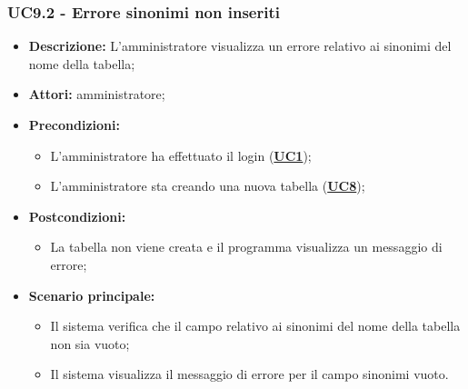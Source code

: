 \documentclass[5pt]{article}
\begin{document}
\subsubsection{UC9.2 - Errore sinonimi non inseriti}
\label{sec:UC9.2}
\begin{itemize}
	\item \textbf{Descrizione:} L’amministratore visualizza un errore relativo ai sinonimi del nome della tabella;
	\item \textbf{Attori:} amministratore;
	\item \textbf{Precondizioni:} 
	\begin{itemize}
		\item L’amministratore ha effettuato il login (\hyperref[sec:UC1]{\textbf{UC1}});
		\item L’amministratore sta creando una nuova tabella (\hyperref[sec:UC1]{\textbf{UC8}});
	\end{itemize}
	\item \textbf{Postcondizioni:} 
	\begin{itemize}
		\item La tabella non viene creata e il programma visualizza un messaggio di errore;
	\end{itemize}
	\item \textbf{Scenario principale:} 
	\begin{itemize}
		\item Il sistema verifica che il campo relativo ai sinonimi del nome della tabella non sia vuoto;
		\item Il sistema visualizza il messaggio di errore per il campo sinonimi vuoto.
	\end{itemize}
\end{itemize}
\end{document}
